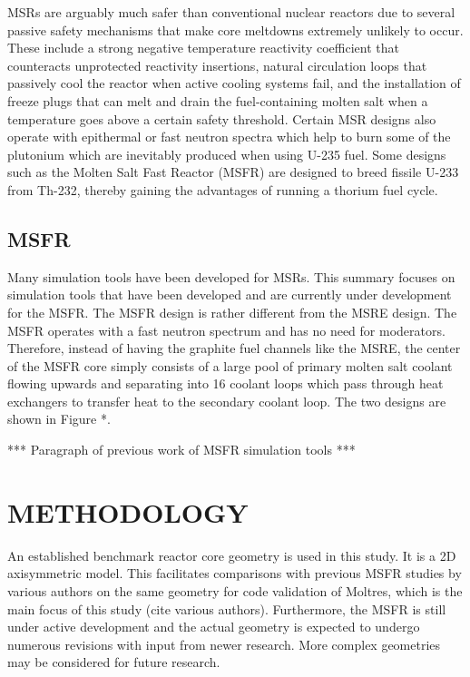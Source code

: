 \documentclass[letterpaper]{mandc2019}
\begin{document}
MSRs are arguably much safer than conventional nuclear reactors due to several passive safety mechanisms that make core meltdowns extremely unlikely to occur. These include a strong negative temperature reactivity coefficient that counteracts unprotected reactivity insertions, natural circulation loops that passively cool the reactor when active cooling systems fail, and the installation of freeze plugs that can melt and drain the fuel-containing molten salt when a temperature goes above a certain safety threshold. Certain MSR designs also operate with epithermal or fast neutron spectra which help to burn some of the plutonium which are inevitably produced when using U-235 fuel. Some designs such as the Molten Salt Fast Reactor (MSFR) are designed to breed fissile U-233 from Th-232, thereby gaining the advantages of running a thorium fuel cycle. 

\subsection{MSFR}



Many simulation tools have been developed for MSRs. This summary focuses on simulation tools that have been developed and are currently under development for the MSFR. The MSFR design is rather different from the MSRE design. The MSFR operates with a fast neutron spectrum and has no need for moderators. Therefore, instead of having the graphite fuel channels like the MSRE, the center of the MSFR core simply consists of a large pool of primary molten salt coolant flowing upwards and separating into 16 coolant loops which pass through heat exchangers to transfer heat to the secondary coolant loop. The two designs are shown in Figure *. 

*** Paragraph of previous work of MSFR simulation tools ***

\section{METHODOLOGY}

An established benchmark reactor core geometry is used in this study. It is a 2D axisymmetric model. This facilitates comparisons with previous MSFR studies by various authors on the same geometry for code validation of Moltres, which is the main focus of this study (cite various authors). Furthermore, the MSFR is still under active development and the actual geometry is expected to undergo numerous revisions with input from newer research. More complex geometries may be considered for future research. 
\end{document}
